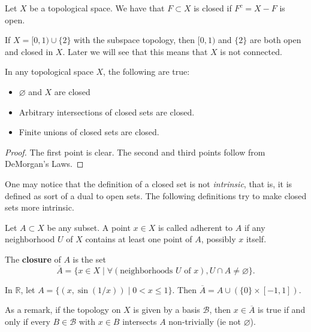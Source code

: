 \begin{definition}
Let $X$ be a topological space. We have that $F \subset X$ is closed if $F^c = X - F$ is open.
\end{definition}

\begin{example}
If $X = [0, 1) \cup \{2\}$ with the subspace topology, then $[0, 1)$ and $\{2\}$ are both open and closed in $X$. Later we will see that this means that $X$ is not connected.
\end{example}

\begin{theorem}
In any topological space $X$, the following are true:
\begin{itemize}
	\item $\varnothing$ and $X$ are closed
	\item Arbitrary intersections of closed sets are closed.
	\item Finite unions of closed sets are closed.
\end{itemize}
\end{theorem}
\begin{proof}
The first point is clear. The second and third points follow from DeMorgan's Laws.
\end{proof}

One may notice that the definition of a closed set is not \textit{intrinsic}, that is, it is defined as sort of a dual to open sets. The following definitions try to make closed sets more intrinsic.

\begin{definition}
	Let $A \subset X$ be any subset. A point $x \in X$ is called adherent to $A$ if any neighborhood $U$ of $X$ contains at least one point of $A$, possibly $x$ itself.
\end{definition}
\begin{definition}
The \textbf{closure} of $A$ is the set 
\[\overline{A} = \{x \in X \mid \forall (\text{neighborhoods $U$ of $x$}), U \cap A \neq \varnothing\}.\]
\end{definition}

\begin{example}
In $\mathbb{R}$, let $A = \{(x, \sin(1/x)) \mid 0 < x \leq 1\}$. Then $\overline{A} = A \cup (\{0\} \times [-1, 1])$.
\end{example}

As a remark, if the topology on $X$ is given by a basis $\mathcal{B}$, then $x \in \overline{A}$ is true if and only if every $B \in \mathcal{B}$ with $x \in B$ intersects $A$ non-trivially (ie not $\varnothing$).